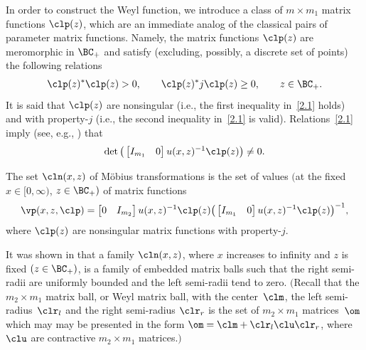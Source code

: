 In order to construct the Weyl function, we introduce a class of $m \times m_1$ matrix functions
$\clp(z)$, which are an immediate analog of the classical pairs
of parameter matrix functions. Namely, the matrix functions
$\clp(z)$ are meromorphic in $\BC_+$ and satisfy
(excluding, possibly, a discrete set of points)
the following relations
\begin{gather}\label{2.1}
\clp(z)^*\clp(z) >0, \qquad \clp(z)^* j \clp(z) \geq 0, \qquad z\in \BC_+.
\end{gather}
It is said that $\clp(z)$ are nonsingular (i.e., the f\/irst inequality in~\eqref{2.1} holds)
and with property-$j$ (i.e., the second inequality in~\eqref{2.1} is valid).
Relations~\eqref{2.1} imply (see, e.g., \cite{FKRSp1}) that
\begin{gather*}  %
\det \big(\begin{bmatrix}
I_{m_1} & 0
\end{bmatrix}u(x,z)^{-1}\clp(z)\big)\not= 0.
\end{gather*}
\begin{Definition} \label{set}
The set $\cln(x,z)$ of M\"obius transformations is the set of values $($at the f\/ixed $x \in [0, \infty)$, $z\in \BC_+)$
of matrix functions
\begin{gather*}%
\vp(x,z,\clp)=\begin{bmatrix}
0 &I_{m_2}
\end{bmatrix}u(x,z)^{-1}\clp(z)\big(\begin{bmatrix}
I_{m_1} & 0
\end{bmatrix}u(x,z)^{-1}\clp(z)\big)^{-1},
\end{gather*}
where $\clp(z)$ are nonsingular matrix functions
 with property-$j$.
 \end{Definition}

 \begin{Remark}\label{MB}
 It was shown in \cite{FKRSp1} that a family $\cln(x,z)$, where $x$ increases to inf\/inity and $z$ is f\/ixed
 $(z \in \BC_+)$,
is a family of embedded matrix balls such that the right semi-radii
 are uniformly bounded and the left semi-radii tend to zero. $($Recall that the $m_2\times m_1$ matrix ball, or Weyl matrix ball, with the center~$\clm$, the left semi-radius~$\clr_l$
 and the right semi-radius $\clr_r$ is the set of
 $m_2\times m_1$ matrices~$\om$
 which may may be presented
 in the form $\om = \clm + \clr_l \clu \clr_r$, where~$\clu$ are contractive $m_2\times m_1$ matrices.$)$
 \end{Remark}

